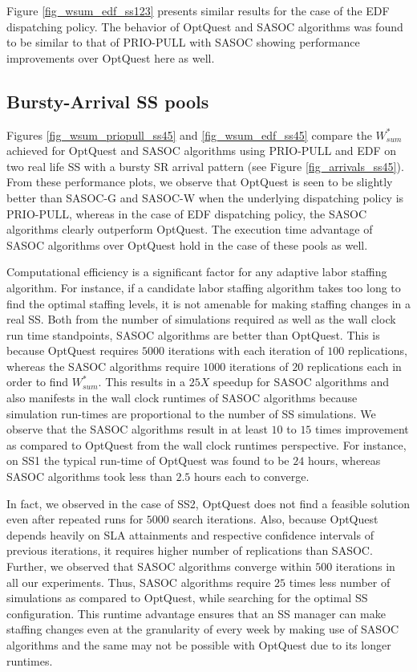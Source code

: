 \documentclass[11pt,letterpaper,english]{article}
\begin{document}
Figure \ref{fig_wsum_edf_ss123} presents similar results for the case of the
EDF dispatching policy. The behavior of OptQuest and SASOC algorithms
was found to be similar to that of PRIO-PULL with SASOC showing
performance improvements over OptQuest here as well.


\subsection{Bursty-Arrival SS pools}

Figures \ref{fig_wsum_priopull_ss45} and \ref{fig_wsum_edf_ss45} compare the
$W^*_{sum}$ achieved for OptQuest and SASOC algorithms using PRIO-PULL
and EDF on two real life SS with a bursty SR arrival pattern (see Figure \ref{fig_arrivals_ss45}).
From these performance plots, we observe that OptQuest is seen to be slightly better than SASOC-G and
SASOC-W when the underlying dispatching policy is PRIO-PULL, whereas in the case of EDF dispatching policy,
the SASOC algorithms clearly outperform OptQuest. The execution time advantage of SASOC algorithms over OptQuest hold in the case of these pools as well.

Computational efficiency is a significant factor for any adaptive labor staffing algorithm. For instance, if a candidate labor staffing algorithm takes too long to find the optimal staffing levels, it is not amenable for making staffing changes in a real SS. Both from the number of simulations required as well as the wall clock run time standpoints, SASOC algorithms are better than OptQuest. This is because
OptQuest requires $5000$ iterations with each iteration of $100$
replications, whereas the SASOC algorithms require $1000$
iterations of $20$ replications each in order to find $W^*_{sum}$.
This results in a $25X$ speedup for SASOC algorithms and also manifests in the wall clock runtimes of SASOC algorithms because simulation run-times are
proportional to the number of SS simulations. We observe that the SASOC
algorithms result in at least $10$ to $15$ times improvement as compared to OptQuest from the wall clock runtimes perspective. For
instance, on SS1 the typical run-time of OptQuest was found to be $24$
hours, whereas SASOC algorithms took less than $2.5$ hours each to converge.

In fact, we observed in the case of SS2, OptQuest does not find a feasible solution even after repeated runs  for $5000$ search iterations. Also, because OptQuest
depends heavily on SLA attainments and respective confidence intervals
of previous iterations, it requires higher number of replications than
SASOC.  Further, we observed that SASOC algorithms converge within $500$ iterations in all our experiments. Thus, SASOC algorithms require $25$ times less number of simulations as compared to OptQuest, while searching for the optimal SS
configuration. This runtime advantage ensures that an SS manager can make staffing changes even at the granularity of every week by making use of SASOC algorithms and the same may not be possible with OptQuest due to its longer runtimes. 
\end{document}
